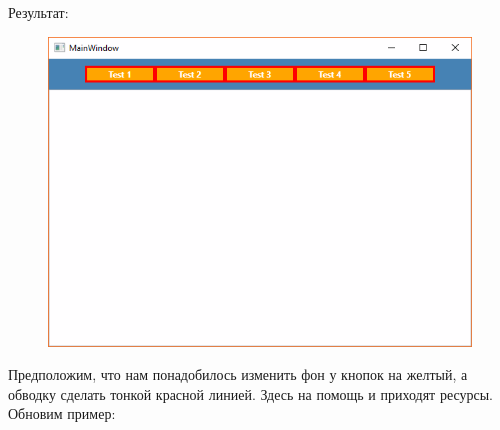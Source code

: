 \newpage
Результат:
\begin{figure}[H]
\centering
\includegraphics[width=1\textwidth]{resources_without.png}
\end{figure}

Предположим, что нам понадобилось изменить фон у кнопок на желтый, а обводку сделать тонкой красной линией. Здесь на помощь и приходят ресурсы. Обновим пример:

